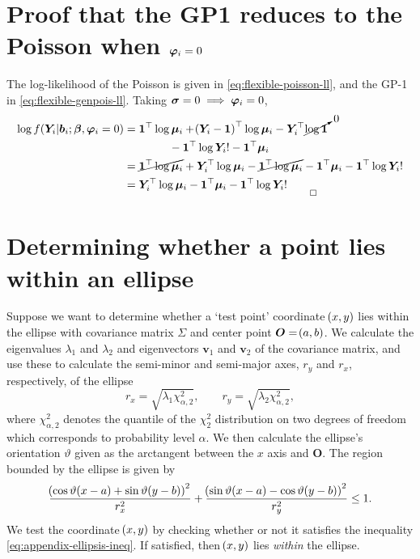 \section{Proof that the GP1 reduces to the Poisson when \texorpdfstring{$\bm{\varphi}_i=0$}{phi}}\label{sec:appendix-gp2poiss-proof}
The log-likelihood of the Poisson is given in \eqref{eq:flexible-poisson-ll}, and the GP-1 in \eqref{eq:flexible-genpois-ll}. Taking $\bm{\sigma}=0\implies\bm{\varphi}_i=0$, 
\begin{equation}
    \begin{aligned}
        \log f\!\left(\bm{Y}_i|\bm{b}_i;\bm{\beta},\bm{\varphi}_i=0\right)&=\bm{1}^\top\log\bm{\mu}_i+\!\left(\bm{Y}_i-\bm{1}\right)^\top\log\bm{\mu}_i-\bm{Y}_i^\top\cancelto{0}{\log\bm{1}}\\&\qquad\qquad-\bm{1}^\top\log\bm{Y}_i!-\bm{1}^\top\bm{\mu}_i\\
        &=\cancel{\bm{1}^\top\log\bm{\mu}_i}+\bm{Y}_i^\top\log\bm{\mu}_i-\cancel{\bm{1}^\top\log\bm{\mu}_i}-\bm{1}^\top\bm{\mu}_i-\bm{1}^\top\log\bm{Y}_i!\\
        &=\bm{Y}_i^\top\log\bm{\mu}_i-\bm{1}^\top\bm{\mu}_i-\bm{1}^\top\log\bm{Y}_i!\qquad\underset{\square}{{}}
    \end{aligned}
\label{eq:appendix-gp2poiss-proof}
\end{equation}

\section{Determining whether a point lies within an ellipse}\label{sec:appendix-ellipsecheck}
Suppose we want to determine whether a `test point' coordinate $\!\left( x,y\right)$ lies within the ellipse with covariance matrix $\Sigma$ and center point $\bm{O}=\!\left( a,b\right)$. We calculate the eigenvalues $\lambda_1$ and $\lambda_2$ and eigenvectors $\bm{v}_1$ and $\bm{v}_2$ of the covariance matrix, and use these to calculate the semi-minor and semi-major axes, $r_y$ and $r_x$, respectively, of the ellipse
\begin{equation}
        r_x = \sqrt{\lambda_1\chi^2_{\alpha,2}},\qquad r_y = \sqrt{\lambda_2\chi^2_{\alpha,2}},
\label{eq:appendix-ellipsis-axes}
\end{equation}
where $\chi^2_{\alpha,2}$ denotes the quantile of the $\chi^2_2$ distribution on two degrees of freedom which corresponds to probability level $\alpha$. We then calculate the ellipse's orientation $\vartheta$ given as the arctangent between the $x$ axis and $\bm{O}$. The region bounded by the ellipse is given by
\begin{equation}
    \frac{\!\left(\cos\vartheta\!\left( x-a\right) + \sin\vartheta\!\left( y-b\right)\right)^2}{r_x^2} +
    \frac{\!\left(\sin\vartheta\!\left( x-a\right) - \cos\vartheta\!\left( y-b\right)\right)^2}{r_y^2}
    \le 1.
\label{eq:appendix-ellipsis-ineq}    
\end{equation}
We test the coordinate $\!\left( x, y\right)$ by checking whether or not it satisfies the inequality \eqref{eq:appendix-ellipsis-ineq}. If satisfied, then $\!\left( x, y\right)$ lies \textit{within} the ellipse.